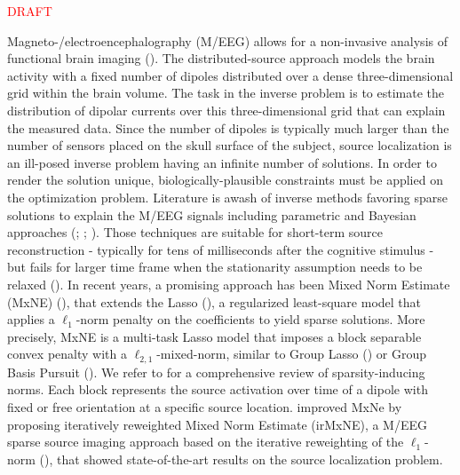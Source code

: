 \textcolor{red}{DRAFT}

Magneto-/electroencephalography (M/EEG) allows for a non-invasive analysis of
functional brain imaging (\cite{Baillet_Mosher_Leahy_2001}). The distributed-source approach models the brain activity
with a fixed number of dipoles distributed over a dense three-dimensional 
grid within the brain volume. The task in the inverse problem is to estimate the 
distribution of dipolar currents over this three-dimensional grid that can explain the 
measured data. Since the number of dipoles is typically much larger than the number 
of sensors placed on the skull surface of the subject, source localization is an 
ill-posed inverse problem having an infinite number of solutions. In order to render
the solution unique, biologically-plausible constraints must be applied on the optimization
problem. Literature is awash of inverse methods favoring sparse solutions to explain the
M/EEG signals including parametric and Bayesian approaches (\cite{Huang_Breheny_Ma_2012};
\cite{Matsuura_Okabe_1995}; \cite{Uutela_Hamalainen_Somersalo_1999}). 
Those techniques are suitable for short-term source reconstruction - typically for tens 
of milliseconds after the cognitive stimulus - but fails for larger time frame when the 
stationarity assumption needs to be relaxed (\cite{Gramfort_Strohmeier_Haueisen_Hamalainen_Kowalski13}). 
In recent years, a promising approach has been Mixed Norm Estimate (MxNE) 
(\cite{Gramfort_Kowalski_Hamalainen12}), that extends the Lasso (\cite{Tibshirani96}), 
a regularized least-square model that applies a $\ell_1$-norm penalty on the coefficients to yield 
sparse solutions. More precisely, MxNE is a multi-task Lasso
model that imposes a block separable convex penalty with a $\ell_{2,1}$-mixed-norm, similar to 
Group Lasso (\cite{Yuan_Lin06}) or Group Basis Pursuit (\cite{Liao_Li_Carin_2014}). We refer to 
\cite{Bach_Jenatton_Mairal_Obozinski12} for a comprehensive review of sparsity-inducing norms. 
Each block represents the source activation over time of a dipole with fixed or free orientation at a specific source location.
\cite{Strohmeier_Bekhti_Haueisen_Gramfort_2016} improved MxNe by proposing iteratively reweighted Mixed Norm Estimate 
(irMxNE), a M/EEG sparse source imaging approach based on the iterative reweighting of the $\ell_1$-
norm (\cite{Candes_Wakin_Boyd08}), that showed state-of-the-art results on the source localization
problem.

